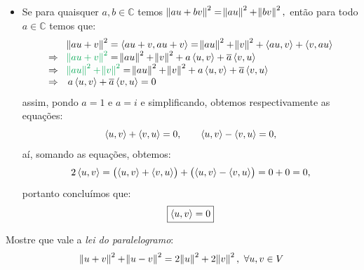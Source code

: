 \documentclass[11pt,a4paper]{article}
\begin{document}
{{\begin{itemize}
\[\begin{array}{rcl}
\end{array}
\]
ou seja:
\[
\boxed{\norm{au+bv}^2= \norm{au}^2 + \norm{bv}^2}
\]
\item Se para quaisquer $a,b\in\mathbb{C}$ temos $\norm{au+bv}^2= \norm{au}^2 + \norm{bv}^2,$ então para todo $a\in\mathbb{C}$ temos que:
\[
\begin{array}{cl}
&\norm{au+v}^2 = \prin{au+v, au+v} = \norm{au}^2 + \norm{v}^2 + \prin{au,v} + \prin{v,au} \\\Rightarrow& \textcolor{Green}{\norm{au+v}^2} = \norm{au}^2 + \norm{v}^2 + a\prin{u,v} + \overline{a}\prin{v,u} \\\Rightarrow& \textcolor{Green}{\norm{au}^2 + \norm{v}^2} = \norm{au}^2 + \norm{v}^2 + a\prin{u,v} + \overline{a}\prin{v,u} \\\Rightarrow& a\prin{u,v} + \overline{a}\prin{v,u} = 0
\end{array}
\]
assim, pondo $a=1$ e $a=i$ e simplificando, obtemos respectivamente as equações:
\[
\left\langle u,v \right\rangle + \left\langle v,u \right\rangle = 0,\quad\quad \left\langle u,v \right\rangle - \left\langle v,u \right\rangle = 0,
\]
aí, somando as equações, obtemos:
\[
2\left\langle u,v \right\rangle=\left(\left\langle u,v \right\rangle+\left\langle v,u \right\rangle\right)+\left(\left\langle u,v \right\rangle-\left\langle v,u \right\rangle\right)=0+0=0,
\]
portanto concluímos que:
\[
\boxed{\left\langle u,v \right\rangle=0}
\]
\end{itemize}
}
}
\begin{exercicio}
Mostre que vale a \emph{lei do paralelogramo}:
\[
\norm{u + v}^2 + \norm{u-v}^2 = 2 \norm{u}^2 + 2 \norm{v}^2, \ \forall u,v \in V
\]
\end{exercicio}
\end{document}
